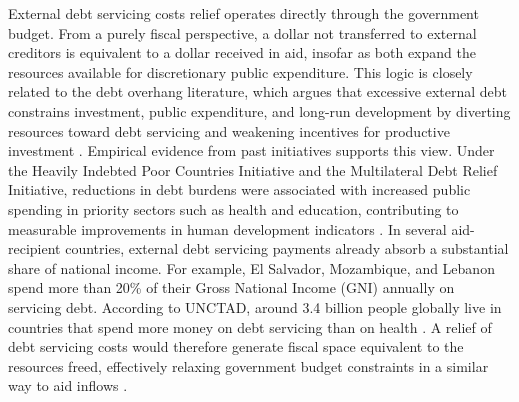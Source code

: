 \documentclass[fleqn,10pt,twocolumn]{wlscirep}
\begin{document}
{
External debt servicing costs relief operates directly through the government budget. From a purely fiscal perspective, a dollar not transferred to external creditors is equivalent to a dollar received in aid, insofar as both expand the resources available for discretionary public expenditure. This logic is closely related to the debt overhang literature, which argues that excessive external debt constrains investment, public expenditure, and long-run development by diverting resources toward debt servicing and weakening incentives for productive investment \cite{krugman1988financing}. Empirical evidence from past initiatives supports this view. Under the Heavily Indebted Poor Countries Initiative and the Multilateral Debt Relief Initiative, reductions in debt burdens were associated with increased public spending in priority sectors such as health and education, contributing to measurable improvements in human development indicators \cite{sachs2002resolving, boyce200513}. In several aid-recipient countries, external debt servicing payments already absorb a substantial share of national income. For example, El Salvador, Mozambique, and Lebanon spend more than 20\% of their Gross National Income (GNI) annually on servicing debt. According to UNCTAD, around 3.4 billion people globally live in countries that spend more money on debt servicing than on health \cite{UNCTAD_2025}. A relief of debt servicing costs would therefore generate fiscal space equivalent to the resources freed, effectively relaxing government budget constraints in a similar way to aid inflows \cite{kose2021global}.

}
\end{document}
